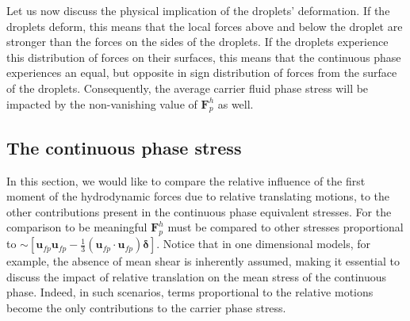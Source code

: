 Let us now discuss the physical implication of the droplets' deformation. 
If the droplets deform, this means that the local forces above and below the droplet are stronger than the forces on the sides of the droplets. 
If the droplets experience this distribution of forces on their surfaces, this means that the continuous phase experiences an equal, but opposite in sign distribution of forces from the surface of the droplets. 
Consequently, the average carrier fluid phase stress will be impacted by the non-vanishing value of $\textbf{F}^h_p$ as well. 

\subsection{The continuous phase stress}

In this section, we would like to compare the relative influence of the first moment of the hydrodynamic forces due to relative translating motions, to the other contributions present in the continuous phase equivalent stresses. 
For the comparison to be meaningful $\textbf{F}^h_p$ must be compared to other stresses proportional to $\sim [\textbf{u}_{fp}\textbf{u}_{fp}-\frac{1}{3}(\textbf{u}_{fp}\cdot\textbf{u}_{fp})\bm\delta]$. 
Notice that in one dimensional models, for example, the absence of mean shear is inherently assumed, making it essential to discuss the impact of relative translation on the mean stress of the continuous phase. 
Indeed, in such scenarios, terms proportional to the relative motions become the only contributions to the carrier phase stress. 

